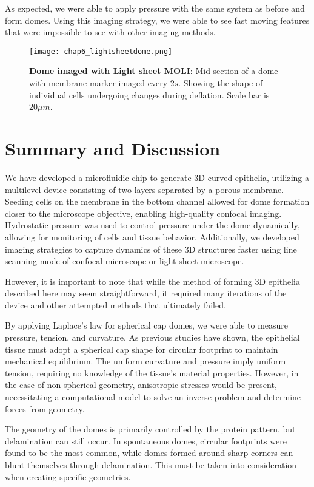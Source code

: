 As expected, we were able to apply pressure with the same system as
before and form domes. Using this imaging strategy, we were able to see
fast moving features that were impossible to see with other imaging
methods.

\begin{figure}[h]
	\centering
	\texttt{[image: chap6\_lightsheetdome.png]}
	\caption{ \textbf{Dome imaged with Light sheet MOLI}: Mid-section of a dome with membrane marker imaged every $2s$. Showing the shape of individual cells undergoing changes during deflation. Scale bar is $20 \mu m$.
	}\label{fig_6_9}
\end{figure}

\newpage
\hypertarget{summary-and-discussion}{%
\section{Summary and Discussion}\label{summary-and-discussion}}

We have developed a microfluidic chip to generate 3D curved epithelia, utilizing a multilevel device consisting of two layers separated by a porous membrane. Seeding cells on the membrane in the bottom channel allowed for dome formation closer to the microscope objective, enabling high-quality confocal imaging. Hydrostatic pressure was used to control pressure under the dome dynamically, allowing for monitoring of cells and tissue behavior. Additionally, we developed imaging strategies to capture dynamics of these 3D structures faster using line scanning mode of confocal microscope or light sheet microscope.  

However, it is important to note that while the method of forming 3D epithelia described here may seem straightforward, it required many iterations of the device and other attempted methods that ultimately failed.  

By applying Laplace's law for spherical cap domes, we were able to measure pressure, tension, and curvature. As previous studies have shown, the epithelial tissue must adopt a spherical cap shape for circular footprint to maintain mechanical equilibrium. The uniform curvature and pressure imply uniform tension, requiring no knowledge of the tissue's material properties. However, in the case of non-spherical geometry, anisotropic stresses would be present, necessitating a computational model to solve an inverse problem and determine forces from geometry.  

The geometry of the domes is primarily controlled by the protein pattern, but delamination can still occur. In spontaneous domes, circular footprints were found to be the most common, while domes formed around sharp corners can blunt themselves through delamination. This must be taken into consideration when creating specific geometries.  

